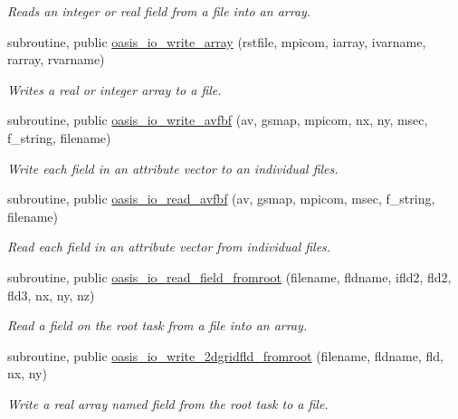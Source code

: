 \begin{DoxyCompactItemize}
\begin{DoxyCompactList}\small\item\em Reads an integer or real field from a file into an array. \end{DoxyCompactList}\item 
subroutine, public \hyperlink{namespacemod__oasis__io_a9ac8ce0ba3223fb59f7f003b50b229cf}{oasis\+\_\+io\+\_\+write\+\_\+array} (rstfile, mpicom, iarray, ivarname, rarray, rvarname)
\begin{DoxyCompactList}\small\item\em Writes a real or integer array to a file. \end{DoxyCompactList}\item 
subroutine, public \hyperlink{namespacemod__oasis__io_a42b325557a774b08d4cba24f387f8b01}{oasis\+\_\+io\+\_\+write\+\_\+avfbf} (av, gsmap, mpicom, nx, ny, msec, f\+\_\+string, filename)
\begin{DoxyCompactList}\small\item\em Write each field in an attribute vector to an individual files. \end{DoxyCompactList}\item 
subroutine, public \hyperlink{namespacemod__oasis__io_ac4a465a698824fb473074bfbd3d92f79}{oasis\+\_\+io\+\_\+read\+\_\+avfbf} (av, gsmap, mpicom, msec, f\+\_\+string, filename)
\begin{DoxyCompactList}\small\item\em Read each field in an attribute vector from individual files. \end{DoxyCompactList}\item 
subroutine, public \hyperlink{namespacemod__oasis__io_af080505b4678a5c68916a700f54ac6e6}{oasis\+\_\+io\+\_\+read\+\_\+field\+\_\+fromroot} (filename, fldname, ifld2, fld2, fld3, nx, ny, nz)
\begin{DoxyCompactList}\small\item\em Read a field on the root task from a file into an array. \end{DoxyCompactList}\item 
subroutine, public \hyperlink{namespacemod__oasis__io_a18912324646473cf8fedd7138cc59a79}{oasis\+\_\+io\+\_\+write\+\_\+2dgridfld\+\_\+fromroot} (filename, fldname, fld, nx, ny)
\begin{DoxyCompactList}\small\item\em Write a real array named field from the root task to a file. \end{DoxyCompactList}\item 

\end{DoxyCompactItemize}
